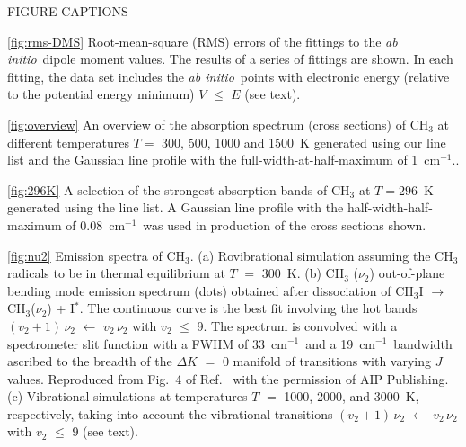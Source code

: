 \documentclass{achemso}
\newcommand{\3}{$_{3}$}
\newcommand{\cm}{cm$^{-1}$}
\newcommand{\ai}{\textit{ab initio}}
\begin{document}


\clearpage


\clearpage
\begin{center}
FIGURE CAPTIONS
\end{center}

\begin{list}{}{\leftmargin 2cm  }
\item[\ref{fig:rms-DMS}]
Root-mean-square (RMS) errors of the fittings to the \ai\ dipole moment values.
The results of a series of fittings are shown. In each fitting, the data set includes the \ai\ points with
electronic energy (relative to the potential energy minimum) $V$ $\leqslant$ $E$ (see text).
\item[\ref{fig:overview}]  An overview of the absorption spectrum (cross sections) of CH$_3$ at different temperatures $T=$ 300, 500, 1000 and 1500~K generated using our line list and the Gaussian line profile with the full-width-at-half-maximum of 1~\cm..
\item[\ref{fig:296K}] A selection of the strongest absorption bands of CH$_3$ at $T=296$~K generated using the line list.  A Gaussian line profile with the half-width-half-maximum of 0.08~\cm\ was used in production of the cross sections shown.
\item[\ref{fig:nu2}]
Emission spectra of CH\3.
(a)
Rovibrational simulation assuming the CH$_3$ radicals to be in
thermal equilibrium at
 $T$ $=$ 300~K.
(b)
CH$_3$ ($\nu_2$) out-of-plane bending mode
emission spectrum (dots) obtained\protect\cite{nu2_82a}
after
 dissociation of
CH$_3$I $\rightarrow$ CH$_3$($\nu_2$) + I$^*$.
  The continuous curve is the best fit\protect\cite{nu2_82a}
 involving the hot bands
 $(v_2+1)\, \nu_2$ $\leftarrow$
 $v_2\, \nu_2$ with
 $v_2$ $\leqslant$ 9. The spectrum is
convolved with a
 spectrometer slit function with a FWHM of
33~\cm\ and a 19~\cm\ bandwidth ascribed to the breadth of the $\Delta K$ $=$ 0 manifold of transitions with varying $J$ values.
Reproduced from Fig.~4 of
Ref.~
 with the permission of AIP Publishing.
(c)
Vibrational simulations
at temperatures $T$ $=$ 1000, 2000, and 3000~K, respectively, taking into account the vibrational
transitions
 $(v_2+1)\, \nu_2$ $\leftarrow$
 $v_2\, \nu_2$ with
 $v_2$ $\leqslant$ 9 (see text).
\end{list}



\clearpage


\clearpage




\end{document}
